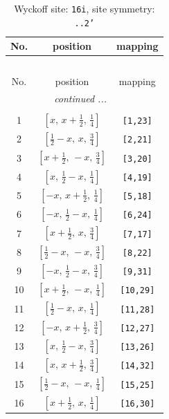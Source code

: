 \documentclass[fleqn,8pt]{jsarticle}
\begin{document}
\begin{longtable}{ccc}
\caption{Wyckoff site: {\tt 16i}, site symmetry: {\tt ..2'}}
 \\
 \hline \hline
No. & position & mapping \\ \hline \endfirsthead

\multicolumn{2}{l}{\tablename\ \thetable{}} \\
 \hline \hline
No. & position & mapping \\ \hline \endhead

 \hline \hline
\multicolumn{2}{r}{\footnotesize\it continued ...} \\ \endfoot

 \hline \hline
\multicolumn{2}{r}{} \\ \endlastfoot

1 & $\left[ x,\, x + \frac{1}{2},\, \frac{1}{4} \right]$ & {\tt [1,23]} \\ \hline
2 & $\left[ \frac{1}{2} - x,\, x,\, \frac{3}{4} \right]$ & {\tt [2,21]} \\ \hline
3 & $\left[ x + \frac{1}{2},\, - x,\, \frac{3}{4} \right]$ & {\tt [3,20]} \\ \hline
4 & $\left[ x,\, \frac{1}{2} - x,\, \frac{1}{4} \right]$ & {\tt [4,19]} \\ \hline
5 & $\left[ - x,\, x + \frac{1}{2},\, \frac{1}{4} \right]$ & {\tt [5,18]} \\ \hline
6 & $\left[ - x,\, \frac{1}{2} - x,\, \frac{1}{4} \right]$ & {\tt [6,24]} \\ \hline
7 & $\left[ x + \frac{1}{2},\, x,\, \frac{3}{4} \right]$ & {\tt [7,17]} \\ \hline
8 & $\left[ \frac{1}{2} - x,\, - x,\, \frac{3}{4} \right]$ & {\tt [8,22]} \\ \hline
9 & $\left[ - x,\, \frac{1}{2} - x,\, \frac{3}{4} \right]$ & {\tt [9,31]} \\ \hline
10 & $\left[ x + \frac{1}{2},\, - x,\, \frac{1}{4} \right]$ & {\tt [10,29]} \\ \hline
11 & $\left[ \frac{1}{2} - x,\, x,\, \frac{1}{4} \right]$ & {\tt [11,28]} \\ \hline
12 & $\left[ - x,\, x + \frac{1}{2},\, \frac{3}{4} \right]$ & {\tt [12,27]} \\ \hline
13 & $\left[ x,\, \frac{1}{2} - x,\, \frac{3}{4} \right]$ & {\tt [13,26]} \\ \hline
14 & $\left[ x,\, x + \frac{1}{2},\, \frac{3}{4} \right]$ & {\tt [14,32]} \\ \hline
15 & $\left[ \frac{1}{2} - x,\, - x,\, \frac{1}{4} \right]$ & {\tt [15,25]} \\ \hline
16 & $\left[ x + \frac{1}{2},\, x,\, \frac{1}{4} \right]$ & {\tt [16,30]} \\
\end{longtable}
\end{document}
